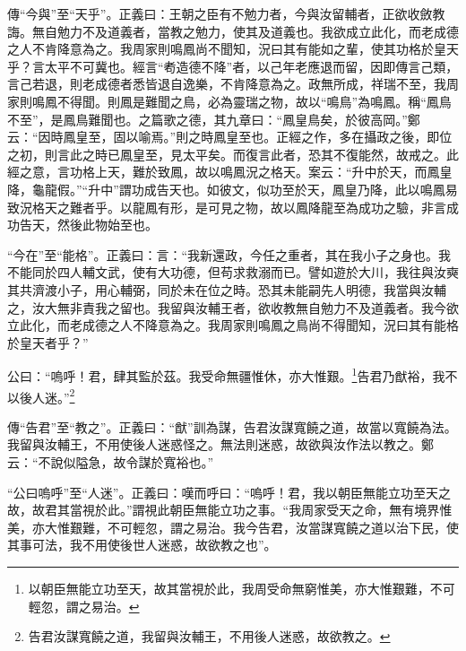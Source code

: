 {\noindent\zhuan{}\fzbyks 傳“今與”至“天乎”。正義曰：王朝之臣有不勉力者，今與汝留輔者，正欲收斂教誨。無自勉力不及道義者，當教之勉力，使其及道義也。我欲成立此化，而老成德之人不肯降意為之。我周家則鳴鳳尚不聞知，況曰其有能如之輩，使其功格於皇天乎？言太平不可冀也。經言“耇造德不降”者，以己年老應退而留，因即傳言己類，言己若退，則老成德者悉皆退自逸樂，不肯降意為之。政無所成，祥瑞不至，我周家則鳴鳳不得聞。則鳳是難聞之鳥，必為靈瑞之物，故以“鳴鳥”為鳴鳳。稱“鳳鳥不至”，是鳳鳥難聞也。之篇歌之德，其九章曰：“鳳皇鳥矣，於彼高岡。”鄭云：“因時鳳皇至，固以喻焉。”則之時鳳皇至也。正經之作，多在攝政之後，即位之初，則言此之時已鳳皇至，見太平矣。而復言此者，恐其不復能然，故戒之。此經之意，言功格上天，難於致鳳，故以鳴鳳況之格天。案云：“升中於天，而鳳皇降，龜龍假。”“升中”謂功成告天也。如彼文，似功至於天，鳳皇乃降，此以鳴鳳易致況格天之難者乎。以龍鳳有形，是可見之物，故以鳳降龍至為成功之驗，非言成功告天，然後此物始至也。 \par}

{\noindent\shu{}\fzkt “今在”至“能格”。正義曰：言：“我新還政，今任之重者，其在我小子之身也。我不能同於四人輔文武，使有大功德，但苟求救溺而已。譬如遊於大川，我往與汝奭其共濟渡小子，用心輔弼，同於未在位之時。恐其未能嗣先人明德，我當與汝輔之，汝大無非責我之留也。我留與汝輔王者，欲收教無自勉力不及道義者。我今欲立此化，而老成德之人不降意為之。我周家則鳴鳳之鳥尚不得聞知，況曰其有能格於皇天者乎？” \par}

公曰：“嗚呼！君，肆其監於茲。我受命無疆惟休，亦大惟艱。\footnote{以朝臣無能立功至天，故其當視於此，我周受命無窮惟美，亦大惟艱難，不可輕忽，謂之易治。}告君乃猷裕，我不以後人迷。”\footnote{告君汝謀寬饒之道，我留與汝輔王，不用後人迷惑，故欲教之。}


{\noindent\zhuan{}\fzbyks 傳“告君”至“教之”。正義曰：“猷”訓為謀，告君汝謀寬饒之道，故當以寬饒為法。我留與汝輔王，不用使後人迷惑怪之。無法則迷惑，故欲與汝作法以教之。鄭云：“不說似隘急，故令謀於寬裕也。” \par}

{\noindent\shu{}\fzkt “公曰嗚呼”至“人迷”。正義曰：嘆而呼曰：“嗚呼！君，我以朝臣無能立功至天之故，故君其當視於此。”謂視此朝臣無能立功之事。“我周家受天之命，無有境界惟美，亦大惟艱難，不可輕忽，謂之易治。我今告君，汝當謀寬饒之道以治下民，使其事可法，我不用使後世人迷惑，故欲教之也”。 \par}

